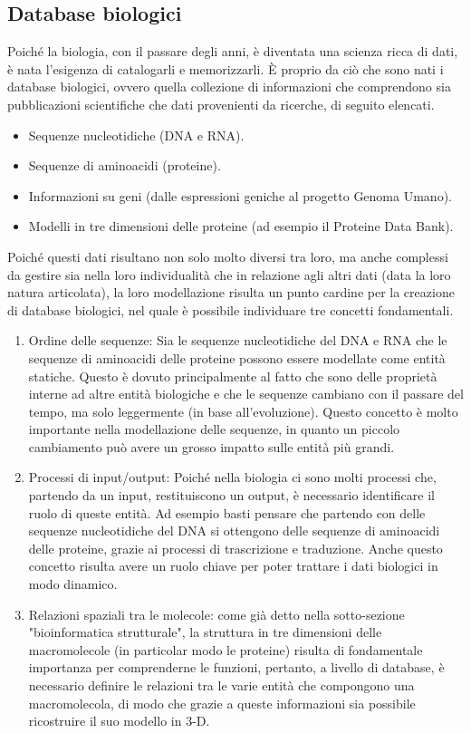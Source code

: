 \subsection{Database biologici}
Poiché la biologia, con il passare degli anni, è diventata una scienza ricca di dati, è nata l'esigenza di catalogarli e memorizzarli. \`E proprio da ciò che sono nati i database biologici, ovvero quella collezione di informazioni che comprendono sia pubblicazioni scientifiche che dati provenienti da ricerche, di seguito elencati.
\begin{itemize}
	\item Sequenze nucleotidiche (DNA e RNA).
	\item Sequenze di aminoacidi (proteine).
	\item Informazioni su geni (dalle espressioni geniche al progetto Genoma Umano).
	\item Modelli in tre dimensioni delle proteine (ad esempio il Proteine Data Bank\cite{proteineDataBank}).
\end{itemize}
Poiché questi dati risultano non solo molto diversi tra loro, ma anche complessi da gestire sia nella loro individualità che in relazione agli altri dati (data la loro natura articolata), la loro modellazione risulta un punto cardine per la creazione di database biologici, nel quale è possibile individuare tre concetti fondamentali.
\begin{enumerate}
	\item Ordine delle sequenze: Sia le sequenze nucleotidiche del DNA e RNA che le sequenze di aminoacidi delle proteine possono essere modellate come entità statiche. Questo è dovuto principalmente al fatto che sono delle proprietà interne ad altre entità biologiche e che le sequenze cambiano con il passare del tempo, ma solo leggermente (in base all'evoluzione).
	\newline
	Questo concetto è molto importante nella modellazione delle sequenze, in quanto un piccolo cambiamento può avere un grosso impatto sulle entità più grandi.
	\item Processi di input/output: Poiché nella biologia ci sono molti processi che, partendo da un input, restituiscono un output, è necessario identificare il ruolo di queste entità. Ad esempio basti pensare che partendo con delle sequenze nucleotidiche del DNA si ottengono delle sequenze di aminoacidi delle proteine, grazie ai processi di trascrizione e traduzione.
	\newline
	Anche questo concetto risulta avere un ruolo chiave per poter trattare i dati biologici in modo dinamico.
	\item Relazioni spaziali tra le molecole: come già detto nella sotto-sezione "bioinformatica strutturale", la struttura in tre dimensioni delle macromolecole (in particolar modo le proteine) risulta di fondamentale importanza per comprenderne le funzioni, pertanto, a livello di database, è necessario definire le relazioni tra le varie entità che compongono una macromolecola, di modo che grazie a queste informazioni sia possibile ricostruire il suo modello in 3-D.
\end{enumerate}
